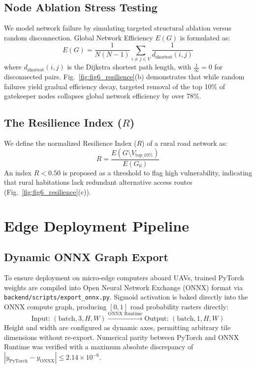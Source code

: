 \documentclass[conference]{IEEEtran}
\begin{document}
\subsection{Node Ablation Stress Testing}
We model network failure by simulating targeted structural ablation versus random disconnection. Global Network Efficiency $E(G)$ is formulated as:
\begin{equation}
    E(G) = \frac{1}{N(N - 1)} \sum_{i \neq j \in V} \frac{1}{d_{\text{shortest}}(i, j)}
    \label{eq:efficiency}
\end{equation}
where $d_{\text{shortest}}(i, j)$ is the Dijkstra shortest path length, with $\frac{1}{\infty} = 0$ for disconnected pairs. Fig.~\ref{fig:fig6_resilience}(b) demonstrates that while random failures yield gradual efficiency decay, targeted removal of the top 10\% of gatekeeper nodes collapses global network efficiency by over 78\%.

\subsection{The Resilience Index ($R$)}
We define the normalized Resilience Index ($R$) of a rural road network as:
\begin{equation}
    R = \frac{E(G \setminus V_{\text{top\_10\%}})}{E(G_0)}
    \label{eq:resilience_index}
\end{equation}
An index $R < 0.50$ is proposed as a threshold to flag high vulnerability, indicating that rural habitations lack redundant alternative access routes (Fig.~\ref{fig:fig6_resilience}(c)).

\section{Edge Deployment Pipeline}
\label{sec:edge}

\subsection{Dynamic ONNX Graph Export}
To ensure deployment on micro-edge computers aboard UAVs, trained PyTorch weights are compiled into Open Neural Network Exchange (ONNX) format via \texttt{backend/scripts/export\_onnx.py}. Sigmoid activation is baked directly into the ONNX compute graph, producing $[0, 1]$ road probability rasters directly:
\begin{equation}
    \text{Input: } (\text{batch}, 3, H, W) \xrightarrow{\text{ONNX Runtime}} \text{Output: } (\text{batch}, 1, H, W)
\end{equation}
Height and width are configured as dynamic axes, permitting arbitrary tile dimensions without re-export. Numerical parity between PyTorch and ONNX Runtime was verified with a maximum absolute discrepancy of $|y_{\text{PyTorch}} - y_{\text{ONNX}}| \le 2.14 \times 10^{-6}$.
\end{document}
